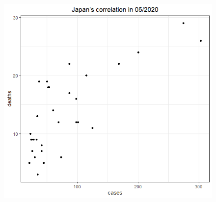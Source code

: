 \documentclass[english,10pt,table]{beamer}
\begin{document}
{\begin{figure}[H]
\begin{center}
        \includegraphics[scale = 0.2]{ix/ix.2/JPN_05_2020.png}
    \end{center}
    \end{figure}
}
\end{document}
